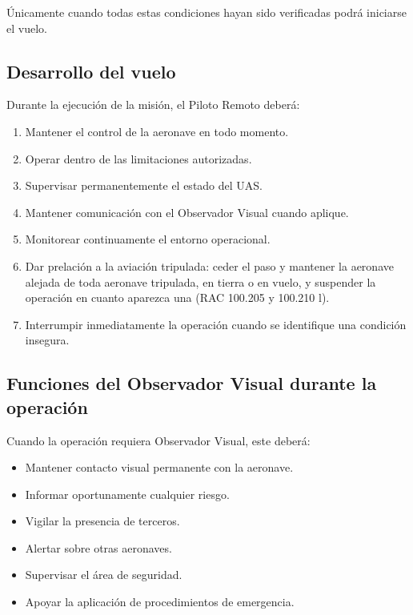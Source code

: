 Únicamente cuando todas estas condiciones hayan sido verificadas podrá iniciarse el vuelo.


\subsection{Desarrollo del vuelo}

Durante la ejecución de la misión, el Piloto Remoto deberá:

\begin{enumerate}

\item Mantener el control de la aeronave en todo momento.

\item Operar dentro de las limitaciones autorizadas.

\item Supervisar permanentemente el estado del UAS.

\item Mantener comunicación con el Observador Visual cuando aplique.

\item Monitorear continuamente el entorno operacional.

\item Dar prelación a la aviación tripulada: ceder el paso y mantener la aeronave alejada de toda aeronave tripulada, en tierra o en vuelo, y suspender la operación en cuanto aparezca una (RAC 100.205 y 100.210 l).

\item Interrumpir inmediatamente la operación cuando se identifique una condición insegura.

\end{enumerate}

\subsection{Funciones del Observador Visual durante la operación}

Cuando la operación requiera Observador Visual, este deberá:

\begin{itemize}

\item Mantener contacto visual permanente con la aeronave.

\item Informar oportunamente cualquier riesgo.

\item Vigilar la presencia de terceros.

\item Alertar sobre otras aeronaves.

\item Supervisar el área de seguridad.

\item Apoyar la aplicación de procedimientos de emergencia.

\end{itemize}


